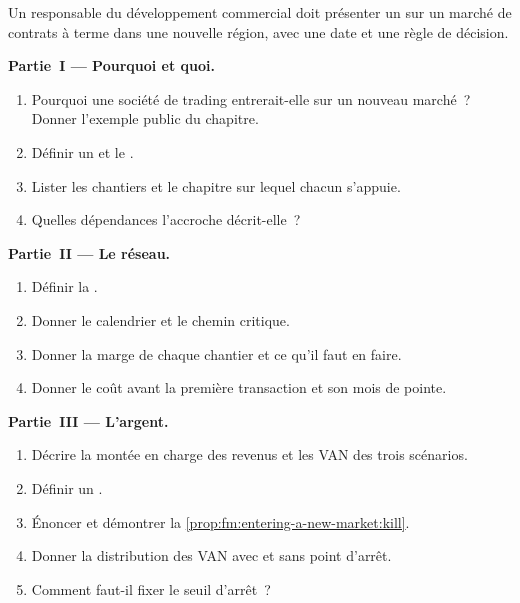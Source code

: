 \begin{problem}\label{pb:fm:entering-a-new-market:1}
Un responsable du développement commercial doit présenter un  sur un marché de contrats à terme dans une nouvelle région, avec une date et une règle de décision.

\medskip\noindent\textbf{Partie~I --- Pourquoi et quoi.}
\begin{enumerate}
\item Pourquoi une société de trading entrerait-elle sur un nouveau marché~? Donner l'exemple public du chapitre.
\item Définir un  et le .
\item Lister les chantiers et le chapitre sur lequel chacun s'appuie.
\item Quelles dépendances l'accroche décrit-elle~?
\end{enumerate}

\medskip\noindent\textbf{Partie~II --- Le réseau.}
\begin{enumerate}[resume]
\item Définir la .
\item Donner le calendrier et le chemin critique.
\item Donner la marge de chaque chantier et ce qu'il faut en faire.
\item Donner le coût avant la première transaction et son mois de pointe.
\end{enumerate}

\medskip\noindent\textbf{Partie~III --- L'argent.}
\begin{enumerate}[resume]
\item Décrire la montée en charge des revenus et les VAN des trois scénarios.
\item Définir un .
\item Énoncer et démontrer la \cref{prop:fm:entering-a-new-market:kill}.
\item Donner la distribution des VAN avec et sans point d'arrêt.
\item Comment faut-il fixer le seuil d'arrêt~?
\end{enumerate}


\end{problem}
